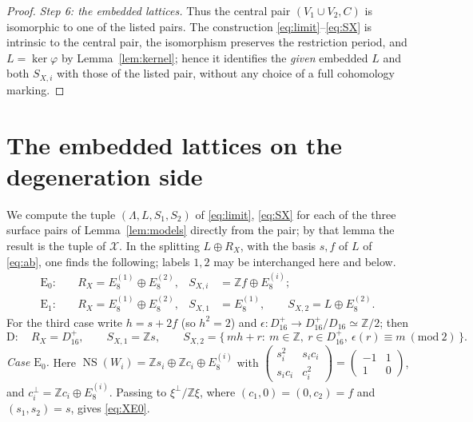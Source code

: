 \documentclass[12pt]{article}
\newcommand{\Z}{\mathbb Z}
\newcommand{\NS}{\operatorname{NS}}
\newcommand{\calX}{\mathcal X}
\theoremstyle{definition}
\theoremstyle{remark}
\begin{document}
\begin{proof}
\emph{Step 6: the embedded lattices.}
Thus the central pair \((V_1\cup V_2,C)\) is isomorphic to one of the
listed pairs. The construction \eqref{eq:limit}--\eqref{eq:SX} is
intrinsic to the central pair, the isomorphism preserves the
restriction period, and \(L=\ker\varphi\) by Lemma~\ref{lem:kernel};
hence it identifies the \emph{given} embedded \(L\) and both
\(S_{X,i}\) with those of the listed pair, without any choice of a full
cohomology marking.
\end{proof}

\section{The embedded lattices on the degeneration side}\label{sec:latticesX}

We compute the tuple \((\Lambda,L,S_1,S_2)\) of \eqref{eq:limit},
\eqref{eq:SX} for each of the three surface pairs of
Lemma~\ref{lem:models} directly from the pair; by that lemma the
result is the tuple of \(\calX\). In the splitting \(L\oplus R_X\),
with the basis \(s,f\) of \(L\) of \eqref{eq:ab}, one finds the
following; labels \(1,2\) may be interchanged here and below.
\begin{align}
 \mathrm E_0:\quad&
 R_X=E_8^{(1)}\oplus E_8^{(2)},&
 S_{X,i}&=\Z f\oplus E_8^{(i)};                \label{eq:XE0}\\
 \mathrm E_1:\quad&
 R_X=E_8^{(1)}\oplus E_8^{(2)},&
 S_{X,1}&=E_8^{(1)},\qquad
 S_{X,2}=L\oplus E_8^{(2)}.                    \label{eq:XE1}
\end{align}
For the third case write \(h=s+2f\) (so \(h^2=2\)) and
\(\epsilon\colon D_{16}^{+}\to D_{16}^{+}/D_{16}\simeq\Z/2\); then
\begin{equation}\label{eq:XD}
 \mathrm D:\quad R_X=D_{16}^{+},\qquad S_{X,1}=\Z s,\qquad
 S_{X,2}=\{\,mh+r:\ m\in\Z,\ r\in D_{16}^{+},\
                   \epsilon(r)\equiv m\ (\mathrm{mod}\ 2)\,\}.
\end{equation}
\emph{Case \(\mathrm E_0\).} Here
\(\NS(W_i)=\Z s_i\oplus\Z c_i\oplus E_8^{(i)}\) with
\(\left(\begin{smallmatrix}s_i^2&s_ic_i\\s_ic_i&c_i^2\end{smallmatrix}\right)
=\left(\begin{smallmatrix}-1&1\\1&0\end{smallmatrix}\right)\), and
\(c_i^\perp=\Z c_i\oplus E_8^{(i)}\). Passing to \(\xi^\perp/\Z\xi\),
where \((c_1,0)=(0,c_2)=f\) and \((s_1,s_2)=s\), gives \eqref{eq:XE0}.
\end{document}
